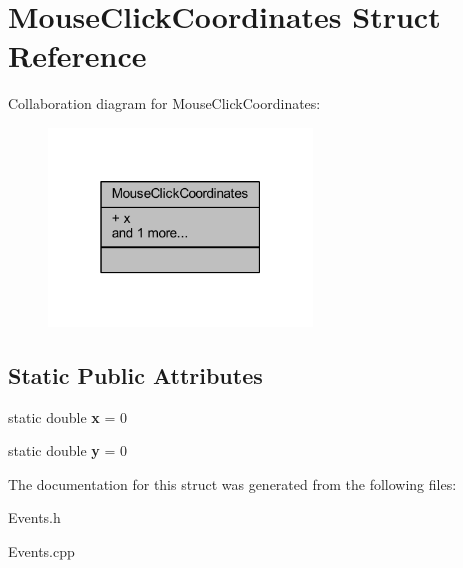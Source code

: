 \hypertarget{struct_mouse_click_coordinates}{}\section{Mouse\+Click\+Coordinates Struct Reference}
\label{struct_mouse_click_coordinates}


Collaboration diagram for Mouse\+Click\+Coordinates\+:\nopagebreak
\begin{figure}[H]
\begin{center}
\leavevmode
\includegraphics[width=199pt]{struct_mouse_click_coordinates__coll__graph}
\end{center}
\end{figure}
\subsection*{Static Public Attributes}
\begin{DoxyCompactItemize}
\item 
\mbox{\label{struct_mouse_click_coordinates_ae2d7c0c719bbe09164c3650819dae696}} 
static double {\bfseries x} = 0
\item 
\mbox{\label{struct_mouse_click_coordinates_a093e1fd64d4009d358b00c1e58f20997}} 
static double {\bfseries y} = 0
\end{DoxyCompactItemize}


The documentation for this struct was generated from the following files\+:\begin{DoxyCompactItemize}
\item 
Events.\+h\item 
Events.\+cpp\end{DoxyCompactItemize}
